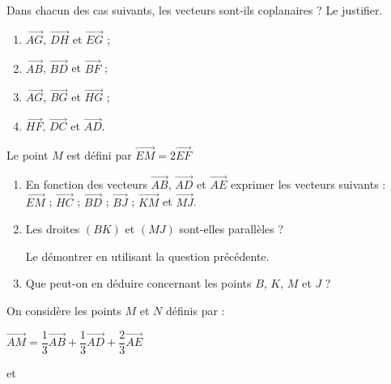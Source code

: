 \documentclass{cornouaille}
\begin{document}
\begin{colonne*exercice}
\columnbreak

\begin{exercice}
  Dans chacun des cas suivants, les vecteurs sont-ils coplanaires ? Le
  justifier.
  \begin{enumerate}
  \item $\overrightarrow{AG}$, $\overrightarrow{DH}$ et
    $\overrightarrow{EG}$ ;
  \item $\overrightarrow{AB}$, $\overrightarrow{BD}$ et
    $\overrightarrow{BF}$ ;
  \item $\overrightarrow{AG}$, $\overrightarrow{BG}$ et
    $\overrightarrow{HG}$ ;
  \item $\overrightarrow{HF}$, $\overrightarrow{DC}$ et
    $\overrightarrow{AD}$.
  \end{enumerate}
\end{exercice}

\begin{exercice}
  Le point $M$ est défini par
  $\overrightarrow{EM}=2\overrightarrow{EF}$
  \begin{enumerate}
  \item En fonction des vecteurs
    $\overrightarrow{AB}$, $\overrightarrow{AD}$ et
    $\overrightarrow{AE}$ exprimer les vecteurs suivants :
    \\$\overrightarrow{EM}$
    ; $\overrightarrow{HC}$
    ; $\overrightarrow{BD}$
    ; $\overrightarrow{BJ}$
    ; $\overrightarrow{KM}$ et $\overrightarrow{MJ}$.
  \item Les droites $(BK)$ et $(MJ)$ sont-elles parallèles ?

    Le démontrer en utilisant la question précédente.
  \item Que peut-on en déduire concernant les points $B$,
    $K$, $M$ et $J$ ?
  \end{enumerate}
\end{exercice}

\begin{exercice*}\label{ex37G2}
  On considère les points $M$ et $N$ définis par :

  $\overrightarrow{AM}=\dfrac{1}{3}\overrightarrow{AB}+\dfrac{1}{3}\overrightarrow{AD}+\dfrac{2}{3}\overrightarrow{AE}$

  et 


\end{exercice*}
\end{colonne*exercice}
\end{document}

